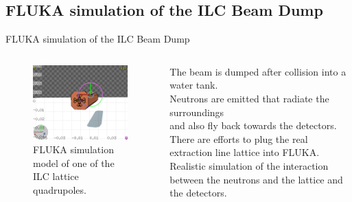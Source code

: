 \documentclass[xcolor={dvipsnames}]{beamer}
\begin{document}
\subsection{FLUKA simulation of the ILC Beam Dump}
\begin{frame}{FLUKA simulation of the ILC Beam Dump}
\flukalogo
\begin{columns}[T]
\begin{column}[b]{0.5\textwidth}
 \begin{figure}
 \centering
\includegraphics[height=0.5\textheight]{figures/FLUKA_quadrupole_model.png}
\caption{\small FLUKA simulation model of one of the ILC lattice quadrupoles.}
\end{figure}
\end{column}
\begin{column}[b]{0.5\textwidth}
The beam is dumped after collision into a water tank.\\
Neutrons are emitted that radiate the surroundings\\
and also fly back towards the detectors.\\
There are efforts to plug the real extraction line lattice into FLUKA.\\
Realistic simulation of the interaction between the neutrons and the lattice and the detectors.
\end{column}
\end{columns}
\end{frame}
\end{document}
